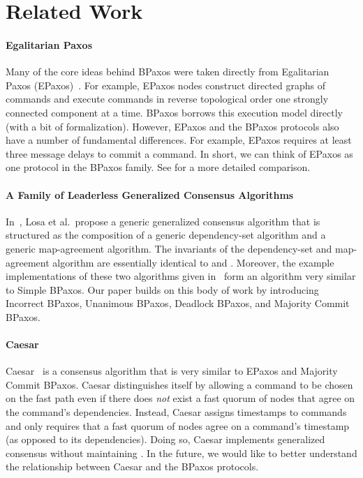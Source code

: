 \section{Related Work}

\paragraph{Egalitarian Paxos}
Many of the core ideas behind BPaxos were taken directly from Egalitarian Paxos
(EPaxos)~\cite{moraru2013there, moraru2013proof}. For example, EPaxos nodes
construct directed graphs of commands and execute commands in reverse
topological order one strongly connected component at a time. BPaxos borrows
this execution model directly (with a bit of formalization). However, EPaxos
and the BPaxos protocols also have a number of fundamental differences.  For
example, EPaxos requires at least three message delays to commit a command.  In
short, we can think of EPaxos as one protocol in the BPaxos family. See
 for a more detailed comparison.

\paragraph{A Family of Leaderless Generalized Consensus Algorithms}
In~\cite{losa2016brief}, Losa et al.\ propose a generic generalized consensus
algorithm that is structured as the composition of a generic dependency-set
algorithm and a generic map-agreement algorithm. The invariants of the
dependency-set and map-agreement algorithm are essentially identical to
 and . Moreover, the
example implementations of these two algorithms given in~\cite{losa2016brief}
form an algorithm very similar to Simple BPaxos. Our paper builds on this body
of work by introducing Incorrect BPaxos, Unanimous BPaxos, Deadlock BPaxos, and
Majority Commit BPaxos.

\paragraph{Caesar}
Caesar~\cite{arun2017speeding} is a consensus algorithm that is very similar to
EPaxos and Majority Commit BPaxos. Caesar distinguishes itself by allowing a
command to be chosen on the fast path even if there does \emph{not} exist a
fast quorum of nodes that agree on the command's dependencies. Instead, Caesar
assigns timestamps to commands and only requires that a fast quorum of nodes
agree on a command's timestamp (as opposed to its dependencies). Doing so,
Caesar implements generalized consensus without maintaining
. In the future, we would like to better understand
the relationship between Caesar and the BPaxos protocols.

